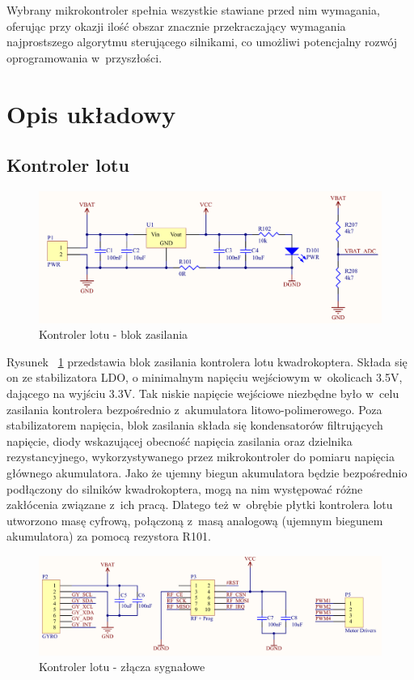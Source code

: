 \documentclass[11pt, twoside]{Thesis} %
\begin{document}
Wybrany mikrokontroler spełnia wszystkie stawiane przed nim wymagania, oferując przy okazji ilość obszar znacznie przekraczający wymagania najprostszego algorytmu sterującego silnikami, co umożliwi potencjalny rozwój oprogramowania w~przyszłości.

\section{Opis układowy}

\subsection{Kontroler lotu}

\begin{figure}[H]
	\centering
	\includegraphics[scale=0.4]{Pictures/QuadroController_PWR_C.png}
		\caption[Kontroler lotu - blok zasilania]{Kontroler lotu - blok zasilania}
	\label{fig:QuadroControllerPWR}
\end{figure}

Rysunek ~\ref{fig:QuadroControllerPWR} przedstawia blok zasilania kontrolera lotu kwadrokoptera. Składa się on ze stabilizatora LDO, o minimalnym napięciu wejściowym w~okolicach 3.5V, dającego na wyjściu 3.3V. Tak niskie napięcie wejściowe niezbędne było w~celu zasilania kontrolera bezpośrednio z~akumulatora litowo-polimerowego. Poza stabilizatorem napięcia, blok zasilania składa się kondensatorów filtrujących napięcie, diody wskazującej obecność napięcia zasilania oraz dzielnika rezystancyjnego, wykorzystywanego przez mikrokontroler do pomiaru napięcia głównego akumulatora. Jako że ujemny biegun akumulatora będzie bezpośrednio podłączony do silników kwadrokoptera, mogą na nim występować różne zakłócenia związane z~ich pracą. Dlatego też w~obrębie płytki kontrolera lotu utworzono masę cyfrową, połączoną z~masą analogową (ujemnym biegunem akumulatora) za pomocą rezystora R101.

\begin{figure}[H]
	\centering
	\includegraphics[scale=0.36]{Pictures/QuadroController_Connector_C.png}
		\caption[Kontroler lotu - złącza sygnałowe]{Kontroler lotu - złącza sygnałowe}
	\label{fig:QuadrotorControllerConnectors}
\end{figure}
\end{document}
